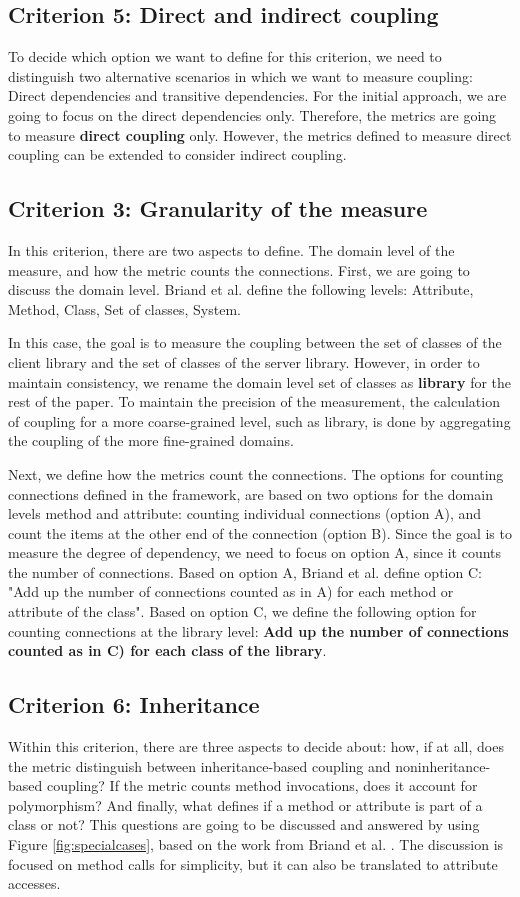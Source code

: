 \documentclass[a4paper]{article}
\begin{document}
\subsection{Criterion 5: Direct and indirect coupling}
To decide which option we want to define for this criterion, we need to distinguish two alternative scenarios in which we want to measure coupling: Direct dependencies and transitive dependencies. For the initial approach, we are going to focus on the direct dependencies only. Therefore, the metrics are going to measure \textbf{direct coupling} only. However, the metrics defined to measure direct coupling can be extended to consider indirect coupling.

\subsection{Criterion 3: Granularity of the measure}
In this criterion, there are two aspects to define. The domain level of the measure, and how the metric counts the connections. First, we are going to discuss the domain level. Briand et al. define the following levels: Attribute, Method, Class, Set of classes, System.

In this case, the goal is to measure the coupling between the set of classes of the client library and the set of classes of the server library. However, in order to maintain consistency, we rename the domain level set of classes as \textbf{library} for the rest of the paper. To maintain the precision of the measurement, the calculation of coupling for a more coarse-grained level, such as library, is done by aggregating the coupling of the more fine-grained domains.

Next, we define how the metrics count the connections. The options for counting connections defined in the framework, are based on two options for the domain levels method and attribute: counting individual connections (option A), and count the items at the other end of the connection (option B). Since the goal is to measure the degree of dependency, we need to focus on option A, since it counts the number of connections. Based on option A, Briand et al. define option C: "Add up the number of connections counted as in A) for each method or attribute of the class". Based on option C, we define the following option for counting connections at the library level: \textbf{Add up the number of connections counted as in C) for each class of the library}.

\subsection{Criterion 6: Inheritance}
Within this criterion, there are three aspects to decide about: how, if at all, does the metric distinguish between inheritance-based coupling and noninheritance-based coupling? If the metric counts method invocations, does it account for polymorphism? And finally, what defines if a method or attribute is part of a class or not? This questions are going to be discussed and answered by using Figure \ref{fig:specialcases}, based on the work from Briand et al. \cite{briand1999unified}. The discussion is focused on method calls for simplicity, but it can also be translated to attribute accesses.
\end{document}
